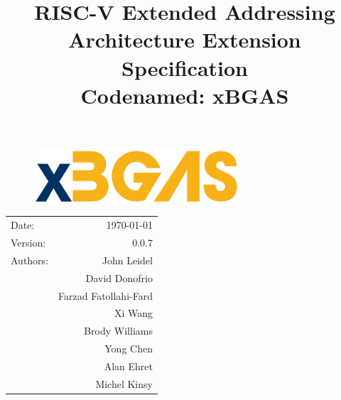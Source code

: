 \documentclass{article}
\title{\textbf{RISC-V Extended Addressing\\Architecture Extension Specification\\Codenamed: xBGAS}} %
\date{} %
\begin{document}
\begin{figure}
\vspace{2in}
\begin{center}
\includegraphics[width=3in]{figures/xbgas.pdf} %
\end{center}
\end{figure}

\maketitle %

\thispagestyle{fancy}

\begin{center}
\begin{tabular}{l r}
Date: & \today \\
Version: & 0.0.7 \\ %
Authors: & John Leidel\\
& David Donofrio\\
& Farzad Fatollahi-Fard\\
& Xi Wang\\
& Brody Williams\\
& Yong Chen\\
& Alan Ehret\\
& Michel Kinsy
\end{tabular}
\end{center}

\clearpage

\tableofcontents

\clearpage



\end{document}
